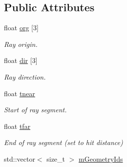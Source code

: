 \subsection*{Public Attributes}
\begin{DoxyCompactItemize}
\item 
\mbox{\label{structvisilib_1_1_visibility_ray_a8c78b0461d9f6e5425c5e14fcd24a9d1}} 
float \mbox{\hyperlink{structvisilib_1_1_visibility_ray_a8c78b0461d9f6e5425c5e14fcd24a9d1}{org}} \mbox{[}3\mbox{]}
\begin{DoxyCompactList}\small\item\em Ray origin. \end{DoxyCompactList}\item 
\mbox{\label{structvisilib_1_1_visibility_ray_ad3c5fe1430162ea249feb953f6a5a347}} 
float \mbox{\hyperlink{structvisilib_1_1_visibility_ray_ad3c5fe1430162ea249feb953f6a5a347}{dir}} \mbox{[}3\mbox{]}
\begin{DoxyCompactList}\small\item\em Ray direction. \end{DoxyCompactList}\item 
\mbox{\label{structvisilib_1_1_visibility_ray_afcf9585cadf9308044ff540f2206a890}} 
float \mbox{\hyperlink{structvisilib_1_1_visibility_ray_afcf9585cadf9308044ff540f2206a890}{tnear}}
\begin{DoxyCompactList}\small\item\em Start of ray segment. \end{DoxyCompactList}\item 
\mbox{\label{structvisilib_1_1_visibility_ray_ad086e44a14588e12ebfb760803a07b47}} 
float \mbox{\hyperlink{structvisilib_1_1_visibility_ray_ad086e44a14588e12ebfb760803a07b47}{tfar}}
\begin{DoxyCompactList}\small\item\em End of ray segment (set to hit distance) \end{DoxyCompactList}\item 
\mbox{\label{structvisilib_1_1_visibility_ray_afcabcbc095ab51fd144519eb568f128b}} 
std\+::vector$<$ size\+\_\+t $>$ \mbox{\hyperlink{structvisilib_1_1_visibility_ray_afcabcbc095ab51fd144519eb568f128b}{m\+Geometry\+Ids}}

\end{DoxyCompactItemize}
